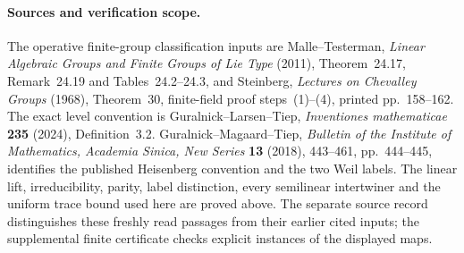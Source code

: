 \paragraph{Sources and verification scope.}
The operative finite-group classification inputs are
Malle--Testerman, \emph{Linear Algebraic Groups and
Finite Groups of Lie Type} (2011), Theorem~24.17,
Remark~24.19 and Tables~24.2--24.3, and Steinberg,
\emph{Lectures on Chevalley Groups} (1968),
Theorem~30, finite-field proof steps~(1)--(4),
printed pp.~158--162. The exact level convention is
Guralnick--Larsen--Tiep, \emph{Inventiones mathematicae}
\textbf{235} (2024), Definition~3.2.
Guralnick--Magaard--Tiep,
\emph{Bulletin of the Institute of Mathematics,
Academia Sinica, New Series} \textbf{13} (2018),
443--461, pp.~444--445, identifies the published
Heisenberg convention and the two Weil labels.
The linear lift, irreducibility, parity, label
distinction, every semilinear intertwiner and the
uniform trace bound used here are proved above.
The separate source record distinguishes these
freshly read passages from their earlier cited
inputs; the supplemental finite certificate
checks explicit instances of the displayed maps.
